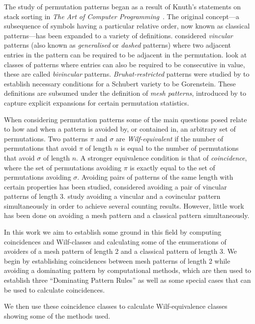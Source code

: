 The study of permutation patterns began as a result of Knuth's statements on
stack sorting in \emph{The Art of Computer Programming}~\cite[p.~243,
Ex.~5,6]{Knuth:1997:ACP:260999}. The original concept---a subsequence of
symbols having a particular relative order, now known as classical
patterns---has been expanded to a variety of definitions.
\textcite{babstein2000} considered \emph{vincular} patterns (also known as
\emph{generalised} or \emph{dashed} patterns) where two adjacent entries in the
pattern can be required to be adjacent in the permutation. \textcite{MR2652101}
look at classes of patterns where entries can also be required to be consecutive in
value, these are called \emph{bivincular} patterns. \emph{Bruhat-restricted}
patterns were studied by \textcite{MR2264071} to establish necessary conditions
for a Schubert variety to be Gorenstein. These definitions are subsumed under
the definition of \emph{mesh patterns}, introduced by
\textcite{journals/combinatorics/BrandenC11} to capture explicit expansions for
certain permutation statistics.

When considering permutation patterns some of the main questions posed relate to
how and when a pattern is avoided by, or contained in, an arbitrary set of
permutations. Two patterns \(\pi\) and \(\sigma\) are \emph{Wilf-equivalent} if
the number of permutations that avoid \(\pi\) of length \(n\) is equal to the
number of permutations that avoid \(\sigma\) of length \(n\). A stronger
equivalence condition is that of \emph{coincidence}, where the set of
permutations avoiding \(\pi\) is exactly equal to the set of permutations
avoiding \(\sigma\). Avoiding pairs of patterns of the same length with certain
properties has been studied, \textcite{MR2178749} considered avoiding
a pair of vincular patterns of length 3. \textcite{2015arXiv151203226B} study
avoiding a vincular and a covincular pattern simultaneously in order to achieve
several counting results. However, little work has been done on
avoiding a mesh pattern and a classical pattern simultaneously.

In this work we aim to establish some ground in this field by computing
coincidences and Wilf-classes and calculating some of the enumerations of
avoiders of a mesh pattern of length 2 and a classical pattern of length 3. We
begin by establishing coincidences between mesh patterns of length 2 while
avoiding a dominating pattern by computational methods, which are then
used to establish three ``Dominating Pattern Rules'' as well as some special cases
that can be used to calculate coincidences.

 We then use these coincidence classes
to calculate Wilf-equivalence classes showing some of the methods used.
